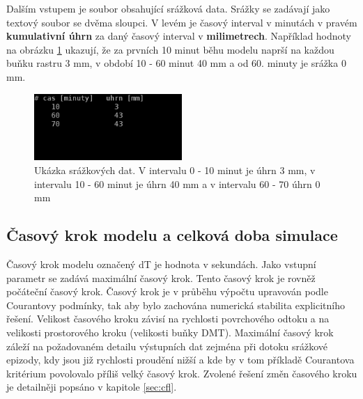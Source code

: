 Dalším vstupem je soubor obsahující srážková data. 
% 
% 
% 
Srážky se zadávají jako textový soubor se dvěma sloupci. V levém je časový interval v minutách v pravém \textbf{kumulativní úhrn} za daný časový interval v \textbf{milimetrech}. Například hodnoty na obrázku \ref{fig:srazkovysoubor} ukazují, že za prvních 10 minut běhu modelu naprší  na každou buňku rastru 3 mm, v období 10 - 60 minut 40 mm a od 60. minuty je srážka 0 mm. 
\begin{figure}
  \centering
  \includegraphics[width=0.5\textwidth]{./img/srazka.png}
  \caption{Ukázka srážkových dat. V intervalu 0 - 10 minut je úhrn 3 mm, v intervalu 10 - 60 minut je úhrn 40 mm a v intervalu 60 - 70 úhrn 0 mm}
  \label{fig:srazkovysoubor}
\end{figure}


\subsection{Časový krok modelu a celková doba simulace} \label{sec:vstupkrok}

Časový krok modelu označený \acs{dT} je hodnota v sekundách. Jako vstupní parametr se zadává maximální časový krok. Tento časový krok je rovněž počáteční časový krok. Časový krok je v průběhu výpočtu upravován podle Courantovy podmínky, tak aby bylo zachována numerická stabilita explicitního řešení. Velikost časového kroku závisí na rychlosti povrchového odtoku a na velikosti prostorového kroku (velikosti buňky DMT). Maximální časový krok záleží na požadovaném detailu výstupních dat zejména při dotoku srážkové epizody, kdy jsou již rychlosti proudění nižší a kde by v tom příkladě Courantova kritérium povolovalo příliš velký časový krok. Zvolené řešení změn časového kroku je detailněji popsáno v kapitole \ref{sec:cfl}. 

